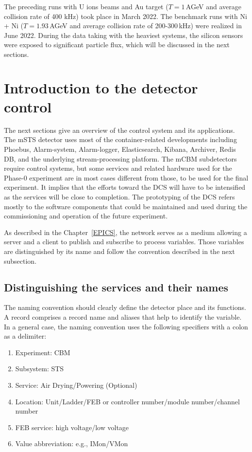 The preceding runs with U ions beams and Au target ($T = 1$\,AGeV and average collision rate of 400 kHz) took place in March 2022. The benchmark runs with Ni + Ni ($T = 1.93$\,AGeV and average collision rate of 200-300\,kHz) were realized in June 2022. During the data taking with the heaviest systems, the silicon sensors were exposed to significant particle flux, which will be discussed in the next sections. 
\section{Introduction to the detector control}
The next sections give an overview of the control system and its applications. The \gls{mSTS} detector uses most of the container-related developments including Phoebus, Alarm-system, Alarm-logger, Elasticsearch, Kibana, Archiver, Redis \gls{DB}, and the underlying stream-processing platform. The \gls{mCBM} subdetectors require control systems, but some services and related hardware used for the Phase-0 experiment are in most cases different from those, to be used for the final experiment. It implies that the efforts toward the \gls{DCS} will have to be intensified as the services will be close to completion. The prototyping of the \gls{DCS} refers mostly to the software components that could be maintained and used during the commissioning and operation of the future experiment. 

As described in the Chapter~\ref{EPICS}, the network serves as a medium allowing a server and a client to publish and subscribe to process variables. Those variables are distinguished by its name and follow the convention described in the next subsection.
\subsection{Distinguishing the services and their names}
The naming convention should clearly define the detector place and its functions.  A record comprises a record name and aliases that help to identify the variable. In a general case, the naming convention uses the following specifiers with a colon as a delimiter:
\begin{enumerate} 
\item Experiment: \gls{CBM}
\item Subsystem: \gls{STS}
\item Service: Air Drying/Powering (Optional)
\item Location: Unit/Ladder/FEB or controller number/module number/channel number
\item \gls{FEB} service: high voltage/low voltage
\item Value abbreviation: e.g., IMon/VMon
\end{enumerate}

